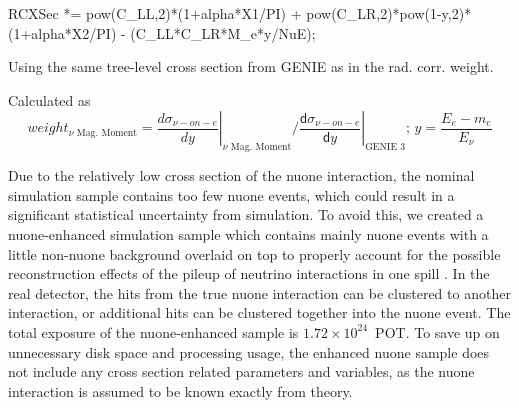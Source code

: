     RCXSec *= pow(C_LL,2)*(1+alpha*X1/PI) +                                                                                                                        
              pow(C_LR,2)*pow(1-y,2)*(1+alpha*X2/PI) -                                                                                                             
              (C_LL*C_LR*M_e*y/NuE);
\fi



Using the same tree-level cross section from GENIE as in the rad. corr. weight.


Calculated as 
\begin{equation}
weight_{\nu\text{ Mag. Moment}} = \left.\frac{d\sigma_{\nu-on-e}}{dy}\right|_{\nu\text{ Mag. Moment}} / \left.\frac{\textsf{d}\sigma_{\nu-on-e}}{\textsf{d}y}\right|_{\text{GENIE 3}};\,y=\frac{E_e-m_e}{E_\nu}
\end{equation}

Due to the relatively low cross section of the \gls{nuone} interaction, the nominal simulation sample contains too few \gls{nuone} events, which could result in a significant statistical uncertainty from simulation. To avoid this, we created a \gls{nuone}-enhanced simulation sample which contains mainly \gls{nuone} events with a little non-\gls{nuone} background overlaid on top to properly account for the possible reconstruction effects of the pileup of neutrino interactions in one spill \cite{NOVA-doc-56383}. In the real detector, the hits from the true \gls{nuone} interaction can be clustered to another interaction, or additional hits can be clustered together into the \gls{nuone} event. The total exposure of the \gls{nuone}-enhanced sample is $1.72\times10^{24}$~\gls{POT}. To save up on unnecessary disk space and processing usage, the enhanced \gls{nuone} sample does not include any cross section related parameters and variables, as the \gls{nuone} interaction is assumed to be known exactly from theory.


